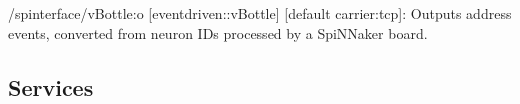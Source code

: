 \begin{DoxyItemize}
\item /spinterface/v\+Bottle\+:o \mbox{[}eventdriven\+::v\+Bottle\mbox{]} \mbox{[}default carrier\+:tcp\mbox{]}\+: Outputs address events, converted from neuron I\+Ds processed by a Spi\+N\+Naker board.
\end{DoxyItemize}\hypertarget{group__zynqGrabber_services_sec}{}\subsection{Services}\label{group__zynqGrabber_services_sec}
